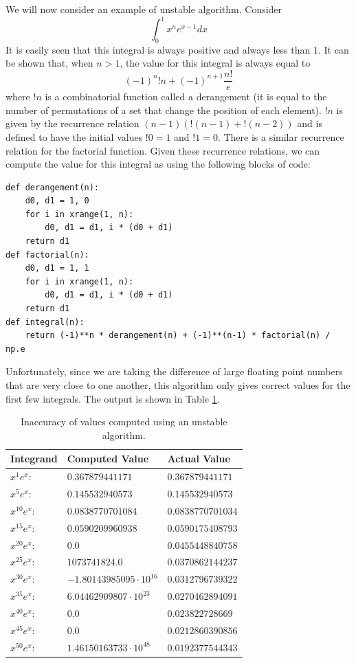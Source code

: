 We will now consider an example of unstable algorithm.
Consider
\[\int_0^1 x^n e^{x - 1} dx\]
It is easily seen that this integral is always positive and always less than $1$.
It can be shown that, when $n > 1$, the value for this integral is always equal to
\[\left(-1\right)^{n} !n + \left(-1\right)^{n + 1} \frac{n!}{e}\]
where $!n$ is a combinatorial function called a derangement (it is equal to the number of permutations of a set that change the position of each element).
$!n$ is given by the recurrence relation $\left(n - 1\right)\left(!\left(n - 1\right) + !\left(n - 2\right)\right)$ and is defined to have the initial values $!0 = 1$ and $!1 = 0$.
There is a similar recurrence relation for the factorial function.
Given these recurrence relations, we can compute the value for this integral as using the following blocks of code:
\begin{lstlisting}
def derangement(n):
    d0, d1 = 1, 0
    for i in xrange(1, n):
        d0, d1 = d1, i * (d0 + d1)
    return d1
def factorial(n):
    d0, d1 = 1, 1
    for i in xrange(1, n):
        d0, d1 = d1, i * (d0 + d1)
    return d1
def integral(n):
    return (-1)**n * derangement(n) + (-1)**(n-1) * factorial(n) / np.e
\end{lstlisting}
Unfortunately, since we are taking the difference of large floating point numbers that are very close to one another, this algorithm only gives correct values for the first few integrals.
The output is shown in Table \ref{table:unstable_computation}.

\begin{table}
\centering
\begin{tabular}{|l|l|l|}
\hline
Integrand & Computed Value & Actual Value \\
\hline
$x^{1}e^{x}$: & $0.367879441171$ & $0.367879441171$ \\
$x^{5}e^{x}$: & $0.145532940573$ & $0.145532940573$ \\
$x^{10}e^{x}$: & $0.0838770701084$ & $0.0838770701034$ \\
$x^{15}e^{x}$: & $0.0590209960938$ & $0.0590175408793$ \\
$x^{20}e^{x}$: & $0.0$ & $0.0455448840758$ \\
$x^{25}e^{x}$: & $1073741824.0$ & $0.0370862144237$ \\
$x^{30}e^{x}$: & $-1.80143985095 \cdot 10^{16}$ & $0.0312796739322$ \\
$x^{35}e^{x}$: & $6.04462909807 \cdot 10^{23}$ & $0.0270462894091$ \\
$x^{40}e^{x}$: & $0.0$ & $0.023822728669$ \\
$x^{45}e^{x}$: & $0.0$ & $0.0212860390856$ \\
$x^{50}e^{x}$: & $1.46150163733 \cdot 10^{48}$ & $0.0192377544343$ \\
\hline
\end{tabular}
\caption{Inaccuracy of values computed using an unstable algorithm.}
\label{table:unstable_computation}
\end{table}


